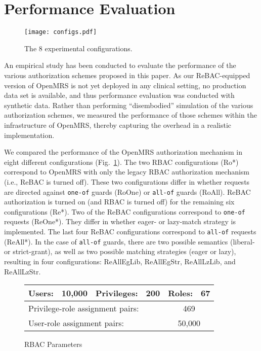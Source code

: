 \documentclass{acm_proc_article-sp}
\newcommand{\textcode}[1]{\texttt{#1}}
\begin{document}
\section{Performance Evaluation}
\label{sec-eval}

\begin{figure}
\centering
\texttt{[image: configs.pdf]}
\caption{\label{fig-configs}The 8 experimental configurations.}
\end{figure}

An empirical study has been conducted to evaluate the performance of
the various authorization schemes proposed in this paper.  As our
ReBAC-equipped version of OpenMRS is not yet deployed in any clinical
setting, no production data set is available, and thus performance
evaluation was conducted with synthetic data.  Rather than performing
``disembodied'' simulation of the various authorization schemes, we
measured the performance of those schemes within the infrastructure of
OpenMRS, thereby capturing the overhead in a realistic implementation.


We compared the performance of the OpenMRS authorization mechanism in
eight different configurations (Fig.~\ref{fig-configs}).  The two RBAC
configurations (\textsf{Ro}*) correspond to OpenMRS with only the
legacy RBAC authorization mechanism (i.e., ReBAC is turned off).
These two configurations differ in whether requests are directed
against \textcode{one-of} guards (\textsf{RoOne}) or \textcode{all-of}
guards (\textsf{RoAll}).  ReBAC authorization is turned on (and RBAC is
turned off) for the remaining six configurations
(\textsf{Re}*).  Two of the ReBAC configurations correspond to
\textcode{one-of} requests (\textsf{ReOne}*). They differ in whether
eager- or lazy-match strategy is implemented.  The last four ReBAC
configurations correspond to \textcode{all-of} requests
(\textsf{ReAll}*).  In the case of \textcode{all-of} guards, there are
two possible semantics (liberal- or strict-grant), as well as two
possible matching strategies (eager or lazy), resulting in four
configurations: \textsf{ReAllEgLib}, \textsf{ReAllEgStr},
\textsf{ReAllLzLib}, and \textsf{ReAllLzStr}.

\begin{figure}
\centering
{\small
\begin{tabular}{|l|c|l|c|l|c|} \hline
Users: & 10,000 &
Privileges: & 200 &
Roles: & 67 \\ \hline
\multicolumn{4}{|l|}{Privilege-role assignment pairs:} &
\multicolumn{2}{c|}{469}  \\ \hline
\multicolumn{4}{|l|}{User-role assignment pairs:} &
\multicolumn{2}{c|}{50,000} \\ \hline
\end{tabular}
}
\caption{\label{fig-RBAC-params}RBAC Parameters}
\end{figure}
\end{document}
